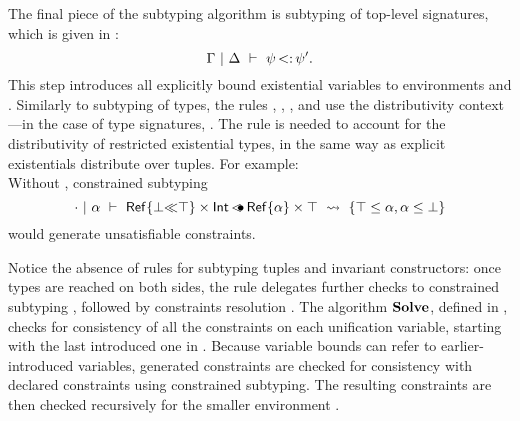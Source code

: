 The final piece of the subtyping algorithm is subtyping of top-level signatures,
which is given in :
\[
    \Gamma~\vert~\Delta\ \vdash\ \psi \operatorname{<:} \psi'.
\]
This step introduces all explicitly bound existential variables to
environments \AEnv and \UEnv.
Similarly to subtyping of types, the rules , ,
, and  use the distributivity context---in
the case of type signatures, \dctxsig.
The rule  is needed to account for the distributivity of restricted
existential types, in the same way as explicit existentials distribute
over tuples. For example:\\
Without , constrained subtyping
\[
    \cdot~\vert~\alpha\ \vdash\ \mathsf{Ref}\{\bot{\operatorname{\ll}}\top\} \times \mathsf{Int} \operatorname{\lessdot\!\!\bullet} \mathsf{Ref}\{\alpha\} \times \top\ \rightsquigarrow\  \{\top \leq \alpha, \alpha \leq \bot\} 
\]
would generate unsatisfiable constraints.

Notice the absence of rules for subtyping tuples and invariant constructors:
once types are reached on both sides, the rule  delegates further
checks to constrained subtyping ,
followed by constraints resolution \solvectrdflt.
The algorithm $\operatorname{\mathbf{Solve}}$, defined in , 
checks for consistency of all the constraints on each
unification variable, starting with the last introduced one in \UEnv.
Because variable bounds can refer to earlier-introduced variables,
generated constraints are checked for consistency with declared constraints
using constrained subtyping. The resulting constraints are then checked
recursively for the smaller environment \UEnv.

